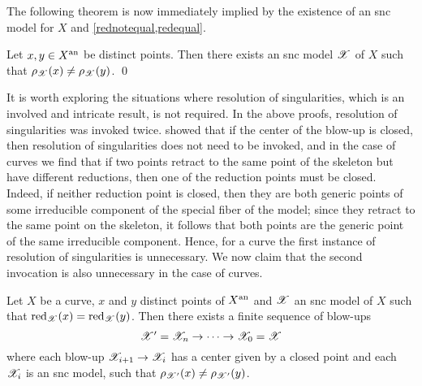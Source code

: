 The following theorem is now immediately implied by the existence of an snc model for $X$ and \cref{rednotequal,redequal}.

\begin{theorem} \label{injectivity}
    Let $x, y \in X^{\text{an}}$ be distinct points. 
    Then there exists an snc model $\mathscr{X}$ of $X$ such that $\rho_{\mathscr{X}}(x) \neq \rho_{\mathscr{X}}(y)$.
    \qed
\end{theorem}

It is worth exploring the situations where resolution of singularities, which is an involved and intricate result, is not required.
In the above proofs, resolution of singularities was invoked twice.
 showed that if the center of the blow-up is closed, then resolution of singularities does not need to be invoked, and in the case of curves we find that if two points retract to the same point of the skeleton but have different reductions, then one of the reduction points must be closed.
Indeed, if neither reduction point is closed, then they are both generic points of some irreducible component of the special fiber of the model; since they retract to the same point on the skeleton, it follows that both points are the generic point of the same irreducible component. 
Hence, for a curve the first instance of resolution of singularities is unnecessary. 
We now claim that the second invocation is also unnecessary in the case of curves.

\begin{theorem}\label{injectivityforcurves}
    Let $X$ be a curve, $x$ and $y$ distinct points of $X^{\text{an}}$ and $\mathscr{X}$ an snc model of $X$ such that $\operatorname{red}_{\mathscr{X}}(x) = \operatorname{red}_{\mathscr{X}}(y)$.
    Then there exists a finite sequence of blow-ups
    \[
        \mathscr{X}' = \mathscr{X}_{n} \to \dots \to \mathscr{X}_{0} = \mathscr{X}
    \]
    where each blow-up $\mathscr{X}_{i + 1} \to \mathscr{X}_{i}$ has a center given by a closed point and each $\mathscr{X}_{i}$ is an snc model, such that $\rho_{\mathscr{X}'}(x) \neq \rho_{\mathscr{X}'}(y)$.
\end{theorem}

